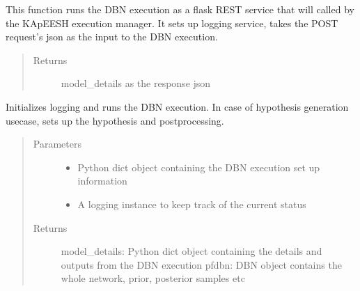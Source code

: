 \documentclass[letterpaper,10pt,english]{sphinxmanual}
\begin{document}
\begin{fulllineitems}
\label{\detokenize{index:dbnrisk_wrapper_aske.process}}
This function runs the DBN execution as a flask REST service that will called by the KApEESH execution manager.
It sets up logging service, takes the POST request’s json as the input to the DBN execution.
\begin{quote}\begin{description}
\item[{Returns}] \leavevmode
model\_details as the response json

\end{description}\end{quote}

\end{fulllineitems}


\begin{fulllineitems}
\label{\detokenize{index:dbnrisk_wrapper_aske.runDBN}}
Initializes logging and runs the DBN execution. In case of hypothesis generation usecase,
sets up the hypothesis and postprocessing.
\begin{quote}\begin{description}
\item[{Parameters}] \leavevmode\begin{itemize}
\item {} 
 \textendash{} Python dict object containing the DBN execution set up information

\item {} 
 \textendash{} A logging instance to keep track of the current status

\end{itemize}

\item[{Returns}] \leavevmode
model\_details: Python dict object containing the details and outputs from the DBN execution
pfdbn: DBN object contains the whole network, prior, posterior samples etc

\end{description}\end{quote}

\end{fulllineitems}
\end{document}
